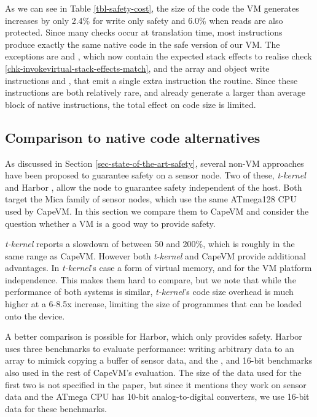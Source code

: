 As we can see in Table \ref{tbl-safety-cost}, the size of the code the VM generates increases by only 2.4\% for write only safety and 6.0\% when reads are also protected. Since many checks occur at translation time, most instructions produce exactly the same native code in the safe version of our VM. The exceptions are  and , which now contain the expected stack effects to realise check \ref{chk-invokevirtual-stack-effects-match}, and the array and object write instructions  and , that emit a single extra  instruction the  routine. Since these instructions are both relatively rare, and already generate a larger than average block of native instructions, the total effect on code size is limited.

\subsection{Comparison to native code alternatives}
As discussed in Section \ref{sec-state-of-the-art-safety}, several non-VM approaches have been proposed to guarantee safety on a sensor node. Two of these, \emph{t-kernel} \cite{Gu:2006ww} and Harbor \cite{Kumar:2007ge}, allow the node to guarantee safety independent of the host. Both target the Mica family of sensor nodes, which use the same ATmega128 CPU used by CapeVM. In this section we compare them to CapeVM and consider the question whether a VM is a good way to provide safety.

\emph{t-kernel} reports a slowdown of between 50 and 200\%, which is roughly in the same range as CapeVM. However both \emph{t-kernel} and CapeVM provide additional advantages. In \emph{t-kernel}'s case a form of virtual memory, and for the VM platform independence. This makes them hard to compare, but we note that while the performance of both systems is similar, \emph{t-kernel}'s code size overhead is much higher at a 6-8.5x increase, limiting the size of programmes that can be loaded onto the device.

A better comparison is possible for Harbor, which only provides safety. Harbor uses three benchmarks to evaluate performance: writing arbitrary data to an array to mimick copying a buffer of sensor data, and the , and 16-bit  benchmarks also used in the rest of CapeVM's evaluation. The size of the data used for the first two is not specified in the paper, but since it mentions they work on sensor data and the ATmega CPU has 10-bit analog-to-digital converters, we use 16-bit data for these benchmarks.

